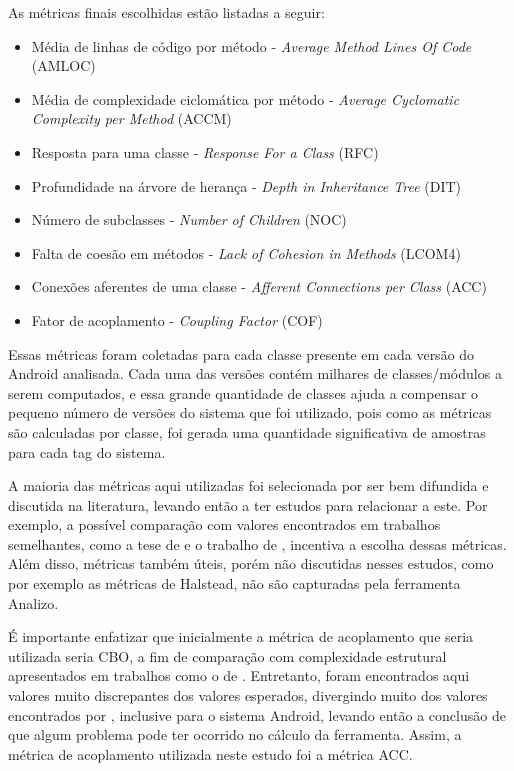 As métricas finais escolhidas estão listadas a seguir:

\begin{itemize}
\item Média de linhas de código por método - \textit{Average Method Lines Of Code} (AMLOC)
\item Média de complexidade ciclomática por método - \textit{Average Cyclomatic Complexity per Method} (ACCM)
\item Resposta para uma classe - \textit{Response For a Class} (RFC)
\item Profundidade na árvore de herança - \textit{Depth in Inheritance Tree} (DIT)
\item Número de subclasses - \textit{Number of Children} (NOC)
\item Falta de coesão em métodos - \textit{Lack of Cohesion in Methods} (LCOM4)
\item Conexões aferentes de uma classe - \textit{Afferent Connections per Class} (ACC)
\item Fator de acoplamento - \textit{Coupling Factor} (COF)
\end{itemize}

Essas métricas foram coletadas para cada classe presente em cada versão do Android analisada. Cada uma das versões contém milhares de classes/módulos a serem computados, e essa grande quantidade de classes ajuda a compensar o pequeno número de versões do sistema que foi utilizado, pois como as métricas são calculadas por classe, foi gerada uma quantidade significativa de amostras para cada tag do sistema.

A maioria das métricas aqui utilizadas foi selecionada por ser bem difundida e discutida na literatura, levando então a ter estudos para relacionar a este. Por exemplo, a possível comparação com valores encontrados em trabalhos semelhantes, como a tese de  e o trabalho de , incentiva a escolha dessas métricas. Além disso, métricas também úteis, porém não discutidas nesses estudos, como por exemplo as métricas de Halstead, não são capturadas pela ferramenta Analizo.

É importante enfatizar que inicialmente a métrica de acoplamento que seria utilizada seria CBO, a fim de comparação com complexidade estrutural apresentados em trabalhos como o de . Entretanto, foram encontrados aqui valores muito discrepantes dos valores esperados, divergindo muito dos valores encontrados por , inclusive para o sistema Android, levando então a conclusão de que algum problema pode ter ocorrido no cálculo da ferramenta. Assim, a métrica de acoplamento utilizada neste estudo foi a métrica ACC.

